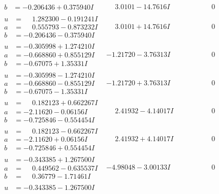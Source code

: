 \documentclass[1p]{elsarticle_modified}
\theoremstyle{definition}
\begin{document}
$$\begin{array}{c|c|c}
\begin{aligned}
b &= -0.206436 + 0.375940 I\end{aligned}
 & \phantom{-}3.0101 - 14.7616 I & \phantom{-0.000000 } 0 \\ \hline\begin{aligned}
u &= \phantom{-}1.282300 - 0.191241 I \\
a &= \phantom{-}0.555793 - 0.873232 I \\
b &= -0.206436 - 0.375940 I\end{aligned}
 & \phantom{-}3.0101 + 14.7616 I & \phantom{-0.000000 } 0 \\ \hline\begin{aligned}
u &= -0.305998 + 1.274210 I \\
a &= -0.668860 + 0.855129 I \\
b &= -0.67075 + 1.35331 I\end{aligned}
 & -1.21720 - 3.76313 I & \phantom{-0.000000 } 0 \\ \hline\begin{aligned}
u &= -0.305998 - 1.274210 I \\
a &= -0.668860 - 0.855129 I \\
b &= -0.67075 - 1.35331 I\end{aligned}
 & -1.21720 + 3.76313 I & \phantom{-0.000000 } 0 \\ \hline\begin{aligned}
u &= \phantom{-}0.182123 + 0.662267 I \\
a &= -2.11620 - 0.06156 I \\
b &= -0.725846 - 0.554454 I\end{aligned}
 & \phantom{-}2.41932 - 4.14017 I & \phantom{-0.000000 } 0 \\ \hline\begin{aligned}
u &= \phantom{-}0.182123 - 0.662267 I \\
a &= -2.11620 + 0.06156 I \\
b &= -0.725846 + 0.554454 I\end{aligned}
 & \phantom{-}2.41932 + 4.14017 I & \phantom{-0.000000 } 0 \\ \hline\begin{aligned}
u &= -0.343385 + 1.267500 I \\
a &= \phantom{-}0.449562 - 0.635537 I \\
b &= \phantom{-}0.36779 - 1.71461 I\end{aligned}
 & -4.98048 - 3.00133 I & \phantom{-0.000000 } 0 \\ \hline\begin{aligned}
u &= -0.343385 - 1.267500 I \\

\end{aligned}
\end{array}$$
\end{document}
